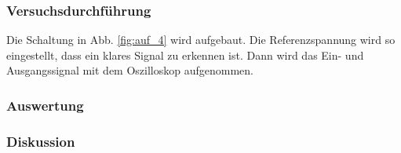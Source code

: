 \documentclass[12pt,a4paper]{article}
\begin{document}
\subsubsection*{Versuchsdurchführung}

Die Schaltung in Abb. \ref{fig:auf_4} wird aufgebaut. Die Referenzspannung wird so eingestellt, dass ein klares Signal zu erkennen ist. Dann wird das Ein- und Ausgangssignal mit dem Oszilloskop aufgenommen.

\subsubsection*{Auswertung}
\subsubsection*{Diskussion}
\end{document}
